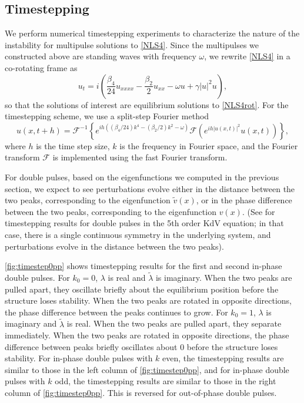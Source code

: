 \documentclass[12pt]{elsarticle}
\def\calF{{\mathcal F}}
\begin{document}
\subsection{Timestepping}

We perform numerical timestepping experiments to characterize the nature of the instability for multipulse solutions to \cref{NLS4}. Since the multipulses we constructed above are standing waves with frequency $\omega$, we rewrite \cref{NLS4} in a co-rotating frame as 
\begin{equation}\label{NLS4rot}
u_t = i\left( \frac{\beta_4}{24}u_{xxxx} - \frac{\beta_2}{2}u_{xx} - \omega u + \gamma |u|^2 u \right),
\end{equation}
so that the solutions of interest are equilibrium solutions to \cref{NLS4rot}. For the timestepping scheme, we use a split-step Fourier method \cite{Agrawal2013,Bogomolov2006} 
\begin{equation}\label{eq:splitstep}
u(x,t+h) = \calF^{-1} \left\{  e^{i h \left( (\beta_4/24) k^4 - (\beta_2/2)k^2 - \omega \right) } \calF\left( e^{ih |u(x,t)|^2} u(x,t) \right) \right\},
\end{equation}
where $h$ is the time step size, $k$ is the frequency in Fourier space, and the Fourier transform $\calF$ is implemented using the fast Fourier transform.

For double pulses, based on the eigenfunctions we computed in the previous section, we expect to see perturbations evolve either in the distance between the two peaks, corresponding to the eigenfunction $\tilde{v}(x)$, or in the phase difference between the two peaks, corresponding to the eigenfunction $v(x)$. (See \cite[Figure 9]{Pelinovsky2007} for timestepping results for double pulses in the 5th order KdV equation; in that case, there is a single continuous symmetry in the underlying system, and perturbations evolve in the distance between the two peaks).

\cref{fig:timestep0pp} shows timestepping results for the first and second in-phase double pulses. For $k_0 = 0$, $\lambda$ is real and $\tilde{\lambda}$ is imaginary. When the two peaks are pulled apart,  they oscillate briefly about the equilibrium position before the structure loses stability. When the two peaks are rotated in opposite directions, the phase difference between the peaks continues to grow. For $k_0 = 1$, $\lambda$ is imaginary and $\tilde{\lambda}$ is real. When the two peaks are pulled apart, they separate immediately. When the two peaks are rotated in opposite directions, the phase difference between peaks briefly oscillates about 0 before the structure loses stability. For in-phase double pulses with $k$ even, the timestepping results are similar to those in the left column of \cref{fig:timestep0pp}, and for in-phase double pulses with $k$ odd, the timestepping results are similar to those in the right column of \cref{fig:timestep0pp}. This is reversed for out-of-phase double pulses.
\end{document}
